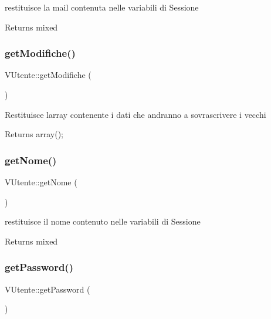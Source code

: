 restituisce la mail contenuta nelle variabili di Sessione

\begin{DoxyReturn}{Returns}
mixed 
\end{DoxyReturn}
\mbox{\label{class_v_utente_acff12f16c55ce487294d48e63616ca58}} 
\subsubsection{\texorpdfstring{get\+Modifiche()}{getModifiche()}}
{\footnotesize\ttfamily V\+Utente\+::get\+Modifiche (\begin{DoxyParamCaption}{ }\end{DoxyParamCaption})}

Restituisce l\textquotesingle{}array contenente i dati che andranno a sovrascrivere i vecchi

\begin{DoxyReturn}{Returns}
array(); 
\end{DoxyReturn}
\mbox{\label{class_v_utente_aee96c810144e5af6ce3679f7968dba7f}} 
\subsubsection{\texorpdfstring{get\+Nome()}{getNome()}}
{\footnotesize\ttfamily V\+Utente\+::get\+Nome (\begin{DoxyParamCaption}{ }\end{DoxyParamCaption})}

restituisce il nome contenuto nelle variabili di Sessione

\begin{DoxyReturn}{Returns}
mixed 
\end{DoxyReturn}
\mbox{\label{class_v_utente_a34488b491367055c085d4f0fd5098c46}} 
\subsubsection{\texorpdfstring{get\+Password()}{getPassword()}}
{\footnotesize\ttfamily V\+Utente\+::get\+Password (\begin{DoxyParamCaption}{ }\end{DoxyParamCaption})}

